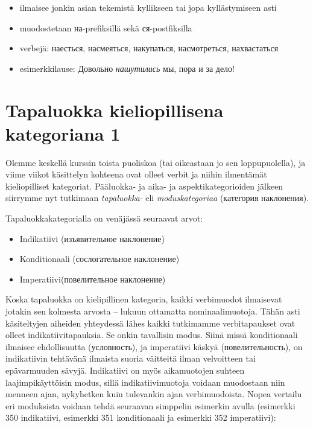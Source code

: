 \documentclass[]{scrreprt}
\providecommand{\tightlist}{%
  \setlength{\itemsep}{0pt}\setlength{\parskip}{0pt}}
\begin{document}
\begin{enumerate}
  \begin{itemize}
  \tightlist
  \item
    ilmaisee jonkin asian tekemistä kyllikseen tai jopa kyllästymiseen
    asti
  \item
    muodostetaan на-prefiksillä sekä ся-postfiksilla
  \item
    verbejä: наесться, насмеяться, накупаться, насмотреться,
    нахвастаться
  \item
    esimerkkilause: Довольно \emph{нашутились} мы, пора и за дело!
  \end{itemize}
\end{enumerate}

\chapter{Tapaluokka kieliopillisena kategoriana
1}\label{luento-18-tapaluokka-kieliopillisena-kategoriana-1}


Olemme keskellä kurssin toista puoliskoa (tai oikeastaan jo sen
loppupuolella), ja viime viikot käsittelyn kohteena ovat olleet verbit
ja niihin ilmentämät kieliopilliset kategoriat. Pääluokka- ja aika- ja
aspektikategorioiden jälkeen siirrymme nyt tutkimaan \emph{tapaluokka-}
eli \emph{moduskategoriaa} (категория наклонения).

Tapaluokkakategorialla on venäjässä seuraavat arvot:

\begin{itemize}
\tightlist
\item
  Indikatiivi (изъявительное наклонение)
\item
  Konditionaali (сослогательное наклонение)
\item
  Imperatiivi(повелительное наклонение)
\end{itemize}

Koska tapaluokka on kielipillinen kategoria, kaikki verbimuodot
ilmaisevat jotakin sen kolmesta arvosta -- lukuun ottamatta
nominaalimuotoja. Tähän asti käsiteltyjen aiheiden yhteydessä lähes
kaikki tutkimamme verbitapaukset ovat olleet indikatiivitapauksia. Se
onkin tavallisin modus. Siinä missä konditionaali ilmaisee ehdollisuutta
(условность), ja imperatiivi käskyä (повелительность), on indikatiivin
tehtävänä ilmaista suoria väitteitä ilman velvoitteen tai epävarmuuden
sävyjä. Indikatiivi on myös aikamuotojen suhteen laajimpikäyttöisin
modus, sillä indikatiivimuotoja voidaan muodostaan niin menneen ajan,
nykyhetken kuin tulevankin ajan verbimuodoista. Nopea vertailu eri
moduksista voidaan tehdä seuraavan simppelin esimerkin avulla (esimerkki
350 indikatiivi, esimerkki 351 konditionaali ja esimerkki 352
imperatiivi):
\end{document}

